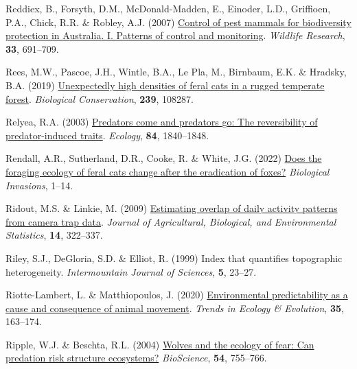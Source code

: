 \documentclass[11pt,a4paper,titlepage,twoside,openright]{style/unimelbthesis}
\newenvironment{CSLReferences}%
  {}%
  {\par}
\begin{document}
\begin{mainmatter}
\begin{CSLReferences}{1}{0}
\leavevmode{}%
Reddiex, B., Forsyth, D.M., McDonald-Madden, E., Einoder, L.D., Griffioen, P.A., Chick, R.R. \& Robley, A.J. (2007) \href{https://doi.org/10.1071/WR05102}{Control of pest mammals for biodiversity protection in {{A}ustralia}. I. Patterns of control and monitoring}. \emph{Wildlife Research}, \textbf{33}, 691--709.

\leavevmode{}%
Rees, M.W., Pascoe, J.H., Wintle, B.A., Le Pla, M., Birnbaum, E.K. \& Hradsky, B.A. (2019) \href{https://doi.org/10.1016/j.biocon.2019.108287}{Unexpectedly high densities of feral cats in a rugged temperate forest}. \emph{Biological Conservation}, \textbf{239}, 108287.

\leavevmode{}%
Relyea, R.A. (2003) \href{https://doi.org/10.1890/0012-9658(2003)084\%5B1840:PCAPGT\%5D2.0.CO;2}{Predators come and predators go: The reversibility of predator-induced traits}. \emph{Ecology}, \textbf{84}, 1840--1848.

\leavevmode{}%
Rendall, A.R., Sutherland, D.R., Cooke, R. \& White, J.G. (2022) \href{https://doi.org/10.1007/s10530-021-02718-x}{Does the foraging ecology of feral cats change after the eradication of foxes?} \emph{Biological Invasions}, 1--14.

\leavevmode{}%
Ridout, M.S. \& Linkie, M. (2009) \href{https://doi.org/10.1198/jabes.2009.08038}{Estimating overlap of daily activity patterns from camera trap data}. \emph{Journal of Agricultural, Biological, and Environmental Statistics}, \textbf{14}, 322--337.

\leavevmode{}%
Riley, S.J., DeGloria, S.D. \& Elliot, R. (1999) Index that quantifies topographic heterogeneity. \emph{Intermountain Journal of Sciences}, \textbf{5}, 23--27.

\leavevmode{}%
Riotte-Lambert, L. \& Matthiopoulos, J. (2020) \href{https://doi.org/10.1016/j.tree.2019.09.009}{Environmental predictability as a cause and consequence of animal movement}. \emph{Trends in Ecology \& Evolution}, \textbf{35}, 163--174.

\leavevmode{}%
Ripple, W.J. \& Beschta, R.L. (2004) \href{https://doi.org/10.1641/0006-3568(2004)054\%5B0755:WATEOF\%5D2.0.CO;2}{Wolves and the ecology of fear: Can predation risk structure ecosystems?} \emph{BioScience}, \textbf{54}, 755--766.


\end{CSLReferences}
\end{mainmatter}
\end{document}
